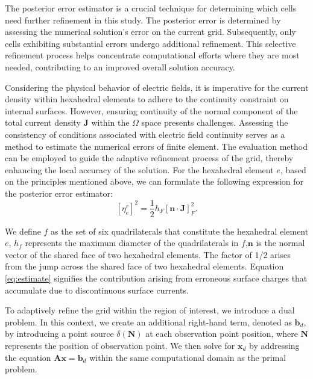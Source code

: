 \documentclass[extra, referee]{gji}
\begin{document}
The posterior error estimator \citep{Mu2019,Ren2013,Ray2023,Wen2023} is a
crucial technique for determining which cells need further refinement in this
study. The posterior error is determined by assessing the numerical solution's
error on the current grid. Subsequently, only cells exhibiting substantial
errors undergo additional refinement. This selective refinement process helps
concentrate computational efforts where they are most needed, contributing to an
improved overall solution accuracy.

Considering the physical behavior of electric fields, it is imperative for the
current density within hexahedral elements to adhere to the continuity
constraint on internal surfaces. However, ensuring continuity of the normal
component of the total current density $\mathbf{J}$ within the $\Omega$ space
presents challenges. Assessing the consistency of conditions associated with
electric field continuity serves as a method to estimate the numerical errors of
finite element. The evaluation method can be employed to guide the adaptive
refinement process of the grid, thereby enhancing the local accuracy of the
solution. For the hexahedral element $e$, based on the principles mentioned
above, we can formulate the following expression for the posterior error
estimator:
\begin{equation}
  \label{eq:estimate}
  [\eta^{r}_{e}]^2 =\frac{1}{2} h_F [{\mathbf{n}} \cdot \mathbf{J}]^2_F.
\end{equation}

We define $f$ as the set of six quadrilaterals that constitute the
hexahedral element $e$, $h_f$ represents the maximum diameter of the
quadrilaterals in $f$,$\mathbf{n}$ is the normal vector of the shared
face of two hexahedral elements. The factor of 1/2 arises from the jump across
the shared face of two hexahedral elements. Equation \ref{eq:estimate} signifies
the contribution arising from erroneous surface charges that accumulate due to
discontinuous surface currents.

To adaptively refine the grid within the region of interest, we introduce a dual
problem. In this context, we create an additional right-hand term, denoted as
$\mathbf{b}_{d}$, by introducing a point source $\delta(\mathbf{N})$ at each
observation point position, where $\mathbf{N}$ represents the position of
observation point. We then solve for $\mathbf{x}_{d}$ by addressing the equation
$\mathbf{A}\mathbf{x}=\mathbf{b}_{d}$ within the same computational domain as
the primal problem.
\end{document}
